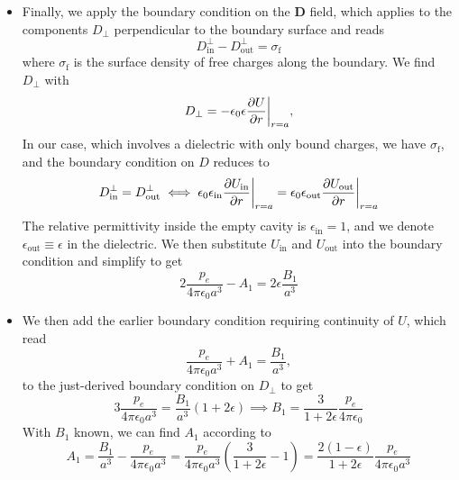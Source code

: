 \documentclass[11pt, a4paper]{article}
\renewcommand{\vec}[1]{\bm{#1}} %
\newcommand{\D}{\vec{D}}  %
\newcommand{\e}{\epsilon}
\newcommand{\ee}{\epsilon_{0}}  %
\begin{document}
\begin{itemize}
	\item Finally, we apply the boundary condition on the $ \D $ field, which applies to the components $ D_{\perp} $ perpendicular to the boundary surface and reads
	\begin{equation*}
		D_{\text{in}}^{\perp} - D_{\text{out}}^{\perp} = \sigma_{\text{f}}
	\end{equation*}
	where $ \sigma_{\text{f}} $ is the surface density of free charges along the boundary. We find $ D_{\perp} $ with
	\begin{equation*}
		D_{\perp} = - \ee \e \pdv{U}{r}\bigg |_{r=a},
	\end{equation*}
	In our case, which involves a dielectric with only bound charges, we have $ \sigma_{\text{f}} $, and the boundary condition on $ D $ reduces to
	\begin{equation*}
		D_{\text{in}}^{\perp} = D_{\text{out}}^{\perp} \iff \ee \e_{\text{in}} \pdv{U_{\text{in}}}{r}\bigg |_{r=a} = \ee \e_{\text{out}} \pdv{U_{\text{out}}}{r}\bigg |_{r=a}
	\end{equation*}
	The relative permittivity inside the empty cavity is $ \e_{\text{in}} = 1 $, and we denote $ \e_{\text{out}} \equiv \e $ in the dielectric. We then substitute $ U_{\text{in}} $ and $ U_{\text{out}} $ into the boundary condition and simplify to get
	\begin{equation*}
		2 \frac{p_{e}}{4\pi \ee a^{3}} - A_{1} = 2 \e \frac{B_{1}}{a^{3}}
	\end{equation*}
	
	\item We then add the earlier boundary condition requiring continuity of $ U $, which read
	\begin{equation*}
		\frac{p_{e}}{4\pi \ee a^{3}} + A_{1} = \frac{B_{1}}{a^{3}},
	\end{equation*}
	to the just-derived boundary condition on $ D_{\perp} $ to get
	\begin{equation*}
		3 \frac{p_{e}}{4 \pi \ee a^{3}} = \frac{B_{1}}{a^{3}}(1 + 2 \e) \implies B_{1} = \frac{3}{1 + 2\e} \frac{p_{e}}{4\pi \ee}
	\end{equation*}
	With $ B_{1} $ known, we can find $ A_{1} $ according to
	\begin{equation*}
		A_{1} = \frac{B_{1}}{a^{3}} - \frac{p_{e}}{4\pi \ee a^{3}} = \frac{p_{e}}{4\pi \ee a^{3}}\left(\frac{3}{1 + 2\e} - 1\right) = \frac{2(1 - \e)}{1 + 2\e} \frac{p_{e}}{4 \pi \ee a^{3}}
	\end{equation*}
	

\end{itemize}
\end{document}
